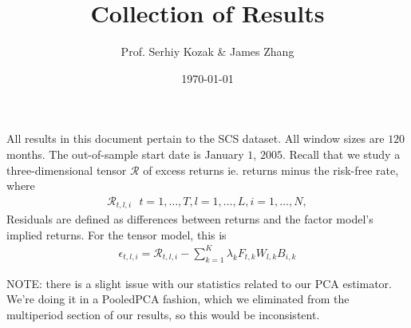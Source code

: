 \documentclass{article}
\title{Collection of Results}
\author{Prof. Serhiy Kozak \& James Zhang}
\date{\today}
\begin{document}
\maketitle



All results in this document pertain to the SCS dataset. All 
window sizes are $120$ months. The out-of-sample start date is January $1$, $2005$. Recall that we study a three-dimensional tensor $\mathcal{R}$ of excess returns ie. returns minus the 
risk-free rate, where
\begin{align}
    \mathcal{R}_{t, l, i} \ \ \ t = 1, \ldots, T, l = 1, \ldots, L, i = 1, \ldots, N,
\end{align}
Residuals are defined as differences between returns and the factor model's implied returns. For the tensor model, this is 
\begin{align}
    \epsilon_{t, l, i} = \mathcal{R}_{t, l, i} - \sum_{k=1}^K \lambda_k F_{t, k} W_{l, k} B_{i, k}
\end{align}

NOTE: there is a slight issue with our statistics related to our PCA estimator. We're doing it in a PooledPCA fashion, which we eliminated 
from the multiperiod section of our results, so this would be inconsistent.
\end{document}
